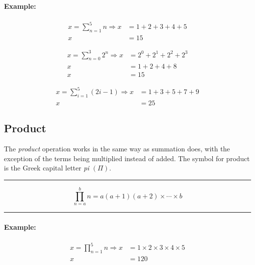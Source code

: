 \documentclass[a5paper,9pt]{book}
\theoremstyle{definition}
\newcommand{\eqlinesur}[1]{%
    \vspace*{\baselineskip}

    \hrule%

    \vspace*{\medskipamount}

    #1

    \vspace*{\medskipamount-0.5\belowdisplayskip}

    \hrule%

    \vspace*{\baselineskip}
}
\newcommand{\Rarr}{\Rightarrow}
\begin{document}
                \paragraph{Example:}

                \begin{align*}
                    x = \sum_{n=1}^{5} n \Rarr x &= 1 + 2 + 3 + 4 + 5 \\
                    x &= 15
                \end{align*}

                \begin{align*}
                    x = \sum_{n=0}^{3} 2^n \Rarr x &= 2^0 + 2^1 + 2^2 + 2^3 \\
                    x &= 1 + 2 + 4 + 8 \\
                    x &= 15
                \end{align*}

                \begin{align*}
                    x = \sum_{i=1}^{5}(2i - 1) \Rarr x &= 1 + 3 + 5 + 7 + 9 \\
                    x &= 25
                \end{align*}

                \pagebreak

            \subsection{Product}

            The \emph{product} operation works in the same way as summation does, with
            the exception of the terms being multiplied instead of added. The symbol for
            product is the Greek capital letter \emph{pi} $\left(\Pi\right)$.

            \eqlinesur{%
                \begin{equation*}
                    \prod_{n=a}^{b} n = a(a+1)(a+2)\times\cdots\times b
                \end{equation*}
            }

            \paragraph{Example:}

            \begin{align*}
                x = \prod_{n=1}^{5} n \Rarr x &= 1\times 2 \times 3 \times 4 \times 5 \\
                x &= 120
            \end{align*}
\end{document}

